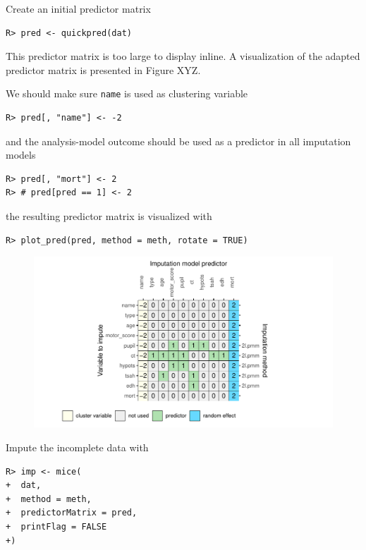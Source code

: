 \documentclass[
  article]{jss}
\begin{document}
Create an initial predictor matrix

\begin{verbatim}
R> pred <- quickpred(dat)
\end{verbatim}

This predictor matrix is too large to display inline. A visualization of
the adapted predictor matrix is presented in Figure XYZ.

We should make sure \texttt{name} is used as clustering variable

\begin{verbatim}
R> pred[, "name"] <- -2
\end{verbatim}

and the analysis-model outcome should be used as a predictor in all
imputation models

\begin{verbatim}
R> pred[, "mort"] <- 2
R> # pred[pred == 1] <- 2
\end{verbatim}

the resulting predictor matrix is visualized with

\begin{verbatim}
R> plot_pred(pred, method = meth, rotate = TRUE)
\end{verbatim}

\begin{figure}[h]

{\centering \includegraphics{manuscript_files/figure-pdf/unnamed-chunk-38-1.pdf}

}

\end{figure}

Impute the incomplete data with

\begin{verbatim}
R> imp <- mice(
+  dat,
+  method = meth,
+  predictorMatrix = pred,
+  printFlag = FALSE
+)
\end{verbatim}
\end{document}
